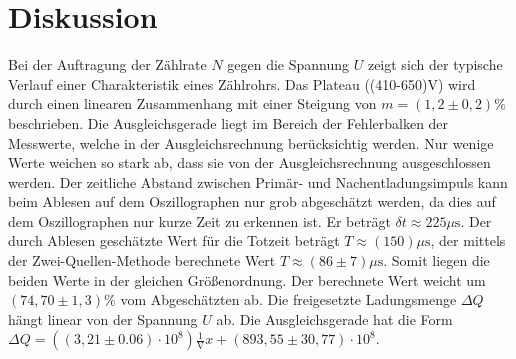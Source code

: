 \section{Diskussion}
\label{sec:Diskussion}

Bei der Auftragung der Zählrate $N$ gegen die Spannung $U$ zeigt sich der typische Verlauf einer Charakteristik eines Zählrohrs. Das Plateau ((410-650)\si{\volt}) wird durch einen linearen Zusammenhang  mit einer Steigung von $m=(1,2 \pm 0,2)\%$ beschrieben.  Die Ausgleichsgerade liegt im Bereich der Fehlerbalken der Messwerte, welche in der Ausgleichsrechnung berücksichtig werden. Nur wenige Werte weichen so stark ab, dass sie von der Ausgleichsrechnung ausgeschlossen werden.
Der zeitliche Abstand zwischen Primär- und Nachentladungsimpuls kann beim Ablesen auf dem Oszillographen nur grob abgeschätzt werden, da dies auf dem Oszillographen nur kurze Zeit zu erkennen ist. Er beträgt $\delta t \approx 225 \mu \si{\second}$.
Der durch Ablesen geschätzte Wert für die Totzeit beträgt $ T\approx (150)\mu\si{\second}$, der mittels der Zwei-Quellen-Methode berechnete Wert $T \approx (86 \pm 7)\mu\si{\second}$. Somit liegen die beiden Werte in der gleichen Größenordnung. Der berechnete Wert weicht um $(74,70 \pm 1,3)\%$ vom Abgeschätzten ab.
Die freigesetzte Ladungsmenge $\Delta Q$ hängt linear von der Spannung $U$ ab. Die Ausgleichsgerade hat die Form $\Delta Q = ((3,21 \pm 0.06)\cdot 10^8)\frac{1}{\si{\volt}}x + (893,55 \pm 30,77)\cdot 10^8$.
